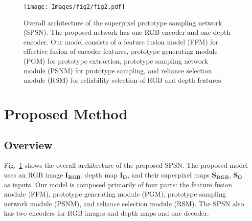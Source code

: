\documentclass[runningheads]{llncs}
\begin{document}
	\begin{figure}[t]
		\setlength{\belowcaptionskip}{-24pt}
		\begin{center}
			\texttt{[image: Images/fig2/fig2.pdf]}
			\caption{Overall architecture of the superpixel prototype sampling network (SPSN). The proposed network has one RGB encoder and one depth encoder. Our model consists of a feature fusion model (FFM) for effective fusion of encoder features, prototype generating module (PGM) for prototype extraction, prototype sampling network module (PSNM) for prototype sampling, and reliance selection module (RSM) for reliability selection of RGB and depth features.}
			\label{fig:model}
		\end{center}
	\end{figure}
	
	\section{Proposed Method}
	\subsection{Overview}
	Fig.~\ref{fig:model} shows the overall architecture of the proposed SPSN. The proposed model uses an RGB image $\mathbf{I_{RGB}}$, depth map $\mathbf{I_D}$, and their superpixel maps $\mathbf{S_{RGB}}$, $\mathbf{S_{D}}$ as inputs. Our model is composed primarily of four parts: the feature fusion module (FFM), prototype generating module (PGM), prototype sampling network module (PSNM), and reliance selection module (RSM). The SPSN also has two encoders for RGB images and depth maps and one decoder.
	
\end{document}

